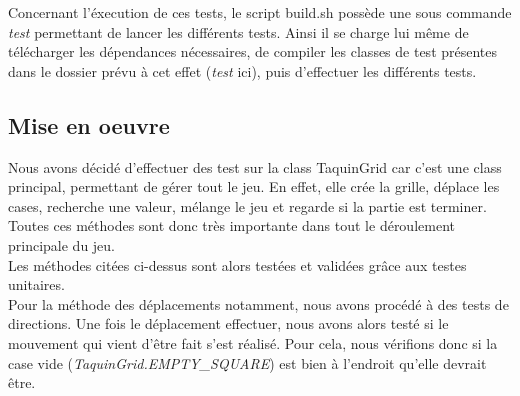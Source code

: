 			Concernant l'éxecution de ces tests, le script build.sh possède une sous commande \textit{test} permettant de lancer les différents tests. Ainsi il se charge lui même de télécharger les dépendances nécessaires, de compiler les classes de test présentes dans le dossier prévu à cet effet (\textit{test} ici), puis d'effectuer les différents tests.

		\subsection{Mise en oeuvre}

			Nous avons décidé d'effectuer des test sur la class TaquinGrid car c'est une class principal, permettant de gérer tout le jeu. En effet, elle crée la grille, déplace les cases, recherche une valeur, mélange le jeu et regarde si la partie est terminer. Toutes ces méthodes sont donc très importante dans tout le déroulement principale du jeu.\\
			Les méthodes citées ci-dessus sont alors testées et validées grâce aux testes unitaires.\\
			Pour la méthode des déplacements notamment, nous avons procédé à des tests de directions. Une fois le déplacement effectuer, nous avons alors testé si le mouvement qui vient d'être fait s'est réalisé. Pour cela, nous vérifions donc si la case vide (\textit{TaquinGrid.EMPTY_SQUARE}) est bien à l'endroit qu'elle devrait être.


